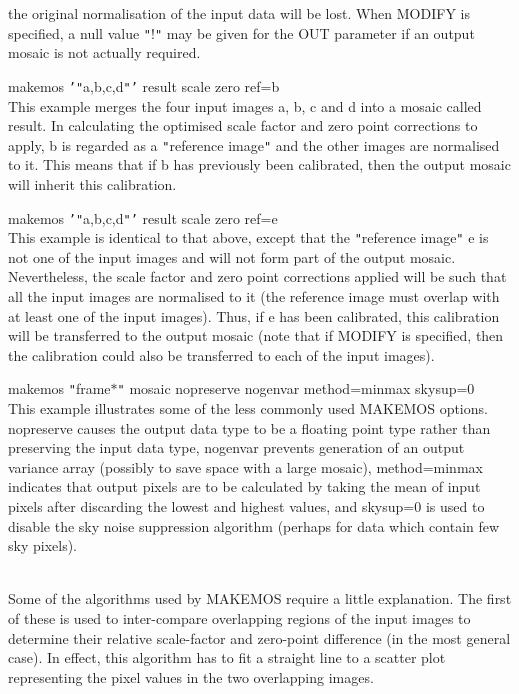 \documentclass[twoside,11pt]{article}
\renewcommand{\_}{\texttt{\symbol{95}}}
\newcommand{\qt}[1]{{\tt "}#1{\tt "}}
\newcommand{\qs}[1]{{\tt '}#1{\tt '}}
\newcommand{\routine}[1]{{\sc #1}}
\newcommand{\sstexamplesubsection}[2]{\sloppy \item{\ssttt #1} \mbox{} \\ #2 }
\newcommand{\sstdiytopic}[2]{\item[#1:] \mbox{} \\[1.3ex] #2}
\newcommand{\sstexamplesubsection}[2]{\item[{\ssttt #1}] #2}
\newcommand{\sstdiytopic}[2]{\item[{#1}] #2 }
\begin{document}
{{{         the original normalisation of the input data will be lost.
         When MODIFY is specified, a null value \qt{!} may be given for
         the OUT parameter if an output mosaic is not actually
         required.
      }
      \sstexamplesubsection{
         makemos \qs{\qt{a,b,c,d}} result scale zero ref=b
      } {
         This example merges the four input images a, b, c and d into a
         mosaic called result. In calculating the optimised scale
         factor and zero point corrections to apply, b is regarded as a
         \qt{reference image} and the other images are normalised to it. This
         means that if b has previously been calibrated, then the
         output mosaic will inherit this calibration.
      }
      \sstexamplesubsection{
         makemos \qs{\qt{a,b,c,d}} result scale zero ref=e
      } {
         This example is identical to that above, except that the
         \qt{reference image} e is not one of the input images and will not
         form part of the output mosaic. Nevertheless, the scale factor
         and zero point corrections applied will be such that all the
         input images are normalised to it (the reference image must
         overlap with at least one of the input images). Thus, if e has
         been calibrated, this calibration will be transferred to the
         output mosaic (note that if MODIFY is specified, then the
         calibration could also be transferred to each of the input
         images).
      }
      \sstexamplesubsection{
         makemos \qt{frame$*$} mosaic nopreserve nogenvar method=minmax
                 skysup=0
      } {
         This example illustrates some of the less commonly used
         \routine{MAKEMOS} options. nopreserve causes the output data type to be
         a floating point type rather than preserving the input data
         type, nogenvar prevents generation of an output variance array
         (possibly to save space with a large mosaic), method=minmax
         indicates that output pixels are to be calculated by taking
         the mean of input pixels after discarding the lowest and
         highest values, and skysup=0 is used to disable the sky noise
         suppression algorithm (perhaps for data which contain few sky
         pixels).
      }
   }
   \sstdiytopic{
      Algorithms Used
   } {
      Some of the algorithms used by \routine{MAKEMOS} require a little
      explanation.  The first of these is used to inter-compare
      overlapping regions of the input images to determine their relative
      scale-factor and zero-point difference (in the most general
      case). In effect, this algorithm has to fit a straight line to a
      scatter plot representing the pixel values in the two overlapping
      images.

}}
\end{document}
